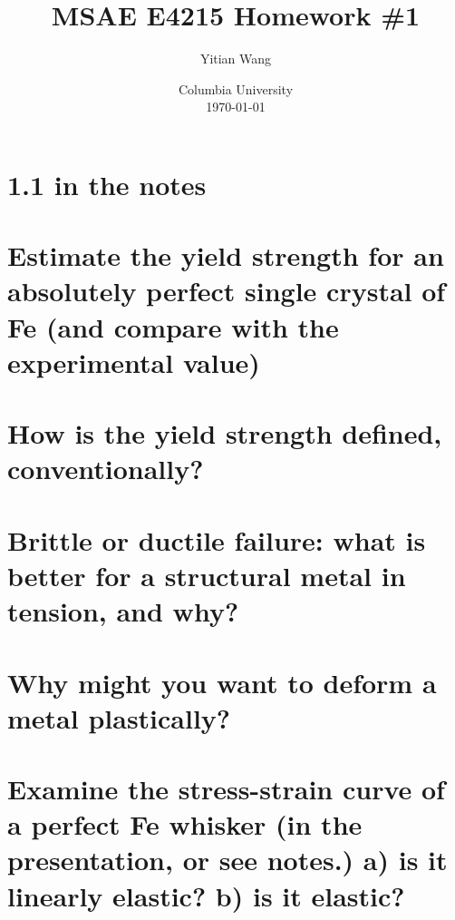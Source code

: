 \documentclass{article}
\title{MSAE E4215 Homework \#1}
\author{Yitian Wang}
\date{Columbia University \\ \today}
\begin{document}
\maketitle
\section{1.1 in the notes}

\section{Estimate the yield strength for an absolutely perfect single crystal of Fe 
(and compare with the experimental value)}

\section{How is the yield strength defined, conventionally?}

\section{Brittle or ductile failure: what is better for a structural metal in tension, and why?}

\section{Why might you want to deform a metal plastically?}

\section{Examine the stress-strain curve of a perfect Fe whisker (in the presentation, or see notes.)  
a) is it linearly elastic?  b) is it elastic?}
\end{document}
